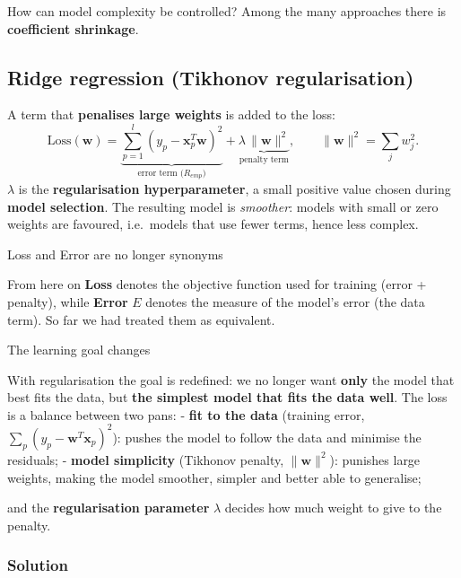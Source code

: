 How can model complexity be controlled? Among the many approaches there
is \textbf{coefficient shrinkage}.

\subsection{Ridge regression (Tikhonov
regularisation)}\label{ridge-regression-regolarizzazione-di-tikhonov}

A term that \textbf{penalises large weights} is added to the loss: \[
\text{Loss}(\mathbf{w}) = \underbrace{\sum_{p=1}^{l}(y_p - \mathbf{x}_p^T\mathbf{w})^2}_{\text{error term (} R_{emp}\text{)}} + \underbrace{\lambda\,\|\mathbf{w}\|^2}_{\text{penalty term}}, \qquad \|\mathbf{w}\|^2 = \sum_j w_j^2.
\] \(\lambda\) is the \textbf{regularisation hyperparameter}, a small
positive value chosen during \textbf{model selection}. The resulting
model is \emph{smoother}: models with small or zero weights are
favoured, i.e.\ models that use fewer terms, hence less complex.

\begin{boxnote}{Loss and Error are no longer synonyms}

From here on \textbf{Loss} denotes the objective function used for
training (error + penalty), while \textbf{Error} \(E\) denotes the
measure of the model's error (the data term). So far we had treated
them as equivalent.

\end{boxnote}

\begin{boxtip}{The learning goal changes}

With regularisation the goal is redefined: we no longer want
\textbf{only} the model that best fits the data, but \textbf{the
simplest model that fits the data well}. The loss is a balance between
two pans: - \textbf{fit to the data} (training error,
\(\sum_p(y_p - \mathbf{w}^T\mathbf{x}_p)^2\)): pushes the model to
follow the data and minimise the residuals; - \textbf{model
simplicity} (Tikhonov penalty, \(\|\mathbf{w}\|^2\)): punishes large
weights, making the model smoother, simpler and better able to
generalise;

and the \textbf{regularisation parameter} \(\lambda\) decides how much
weight to give to the penalty.

\end{boxtip}

\subsubsection{Solution}\label{soluzione}

